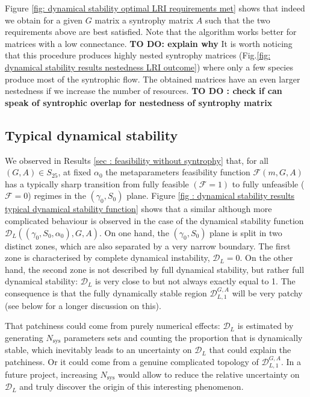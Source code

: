 \documentclass[12pt, titlepage]{report}
\begin{document}
Figure \ref{fig: dynamical stability optimal LRI requirements met} shows that indeed we obtain for a given $G$ matrix a syntrophy matrix $A$ such that the two requirements above are best satisfied. Note that the algorithm works better for matrices with a low connectance. \textbf{TO DO: explain why}
It is worth noticing that this procedure produces highly nested syntrophy matrices (Fig.\ref{fig: dynamical stability results nestedness LRI outcome}) where only a few species produce most of the syntrophic flow. The obtained matrices have an even larger nestedness if we increase the number of resources. \textbf{TO DO : check if can speak of syntrophic overlap for nestedness of syntrophy matrix}

\subsection{Typical dynamical stability}
We observed in Results \ref{sec : feasibility without syntrophy} that, for all $(G,A) \in S_{25}$, at fixed $\alpha_0$ the metaparameters feasibility function $\mathcal{F}\left(m, G, A\right)$ has a typically sharp transition from fully feasible $(\mathcal{F}=1)$ to fully unfeasible ($\mathcal{F}=0$) regimes in the $(\gamma_0, S_0)$ plane. Figure \ref{fig : dynamical stability results typical dynamical stability function} shows that a similar although more complicated behaviour is observed in the case of the dynamical stability function $\mathcal{D}_L\left((\gamma_0, S_0, \alpha_0), G, A\right)$. On one hand, the $(\gamma_0, S_0)$ plane is split in two distinct zones, which are also separated by a very narrow boundary. The first zone is characterised by complete dynamical instability, \ie $\mathcal{D}_L =0$. On the other hand, the second zone is not described by full dynamical stability, but rather  full dynamical stability: $\mathcal{D}_L$ is very close to but not always exactly equal to 1. The consequence is that the fully dynamically stable region $\mathcal{D}_{L,1}^{G,A}$ will be very patchy (see below for a longer discussion on this).

That patchiness could come from purely numerical effects: $\mathcal{D}_L$ is estimated by generating $N_\text{sys}$ parameters sets and counting the proportion that is dynamically stable, which inevitably leads to an uncertainty on $\mathcal{D}_L$ that could explain the patchiness. Or it could come from a genuine complicated topology of $\mathcal{D}_{L,1}^{G,A}$. In a future project, increasing $N_\text{sys}$ would allow to reduce the relative uncertainty on $\mathcal{D}_L$ and truly discover the origin of this interesting phenomenon.
\end{document}
